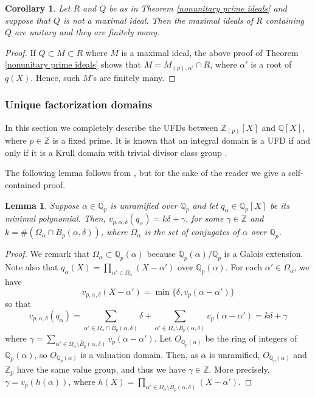 \documentclass[10pt]{article}
\numberwithin{equation}{section}
\newtheorem{Lem}[equation]{Lemma}
\newtheorem{Cor}[equation]{Corollary}
\theoremstyle{definition}
\theoremstyle{definition}
\newcommand{\Q}{\mathbb{Q}}
\newcommand{\Z}{\mathbb{Z}}
\newcommand{\oQp}{\overline{\Q_p}}
\begin{document}
\begin{Cor}
Let $R$ and $Q$ be as in Theorem \ref{nonunitary prime ideals} and suppose that $Q$ is not a maximal ideal. Then the maximal ideals of $R$ containing $Q$ are unitary and they are finitely many.
\end{Cor}
\begin{proof}
    If $Q\subset M\subset R$ where $M$ is a maximal ideal, the above proof of Theorem \ref{nonunitary prime ideals} shows that $M=M_{(p),\alpha'}\cap R$, where $\alpha'$ is a root of $q(X)$. Hence, such $M$'s are finitely many.
 \end{proof}
\vskip0.2cm

\subsubsection{Unique factorization domains}\label{section UFD local}

In this section we completely describe the UFDs between $\Z_{(p)}[X]$ and $\Q[X]$, where $p\in\Z$ is a fixed prime.
 It is known that an integral domain is a UFD if and only if it is a Krull domain with trivial divisor class group \cite[Proposition 6.1]{Fossum}.

The following lemma follows from \cite[Proposition 3.2 \& Proposition 3.7]{PS2}, but for the sake of the reader we give a self-contained proof.

\begin{Lem}\label{conjugates in the ball}
Suppose $\alpha\in\oQp$ is unramified over $\Q_p$ and let $q_{\alpha}\in\Q_p[X]$ be its minimal polynomial. Then, $v_{p,\alpha,\delta}(q_{\alpha})=k\delta+\gamma$, for some $\gamma\in\Z$ and $k=\#(\Omega_{\alpha}\cap\bar B_p(\alpha,\delta))$, where $\Omega_{\alpha}$ is the set of conjugates of $\alpha$ over $\Q_p$.
\end{Lem}
\begin{proof}
We remark that $\Omega_{\alpha}\subset\Q_p(\alpha)$ because $\Q_p(\alpha)/\Q_p$ is a Galois extension. Note also that $q_{\alpha}(X)=\prod\limits_{\alpha'\in\Omega_{\alpha}}(X-\alpha')$ over $\Q_p(\alpha)$.  
 For each $\alpha'\in\Omega_{\alpha}$, we have
$$v_{p,\alpha,\delta}(X-\alpha')=\min\{\delta,v_p(\alpha-\alpha')\}$$
so that 
$$v_{p,\alpha,\delta}(q_{\alpha})=\sum_{\alpha'\in\Omega_{\alpha}\cap\bar B_p(\alpha,\delta)}\delta+\sum_{\alpha'\in\Omega_{\alpha}\setminus \bar B_p(\alpha,\delta)}v_p(\alpha-\alpha')=k\delta+\gamma$$
where $\gamma=\sum\limits_{\alpha'\in\Omega_{\alpha}\setminus \bar B_p(\alpha,\delta)}v_p(\alpha-\alpha')$. Let $O_{\Q_p(\alpha)}$ be
the ring of integers of $\Q_p(\alpha)$, so $O_{\Q_p(\alpha)}$ is a valuation domain. 
Then, as $\alpha$ is unramified,
$O_{\Q_p(\alpha)}$ and $\Z_p$ have the same value group, and thus we have $\gamma\in\Z$. More precisely, $\gamma=v_p(h(\alpha))$, where $h(X)=\prod\limits_{\alpha'\in\Omega_{\alpha}\setminus \bar B_p(\alpha,\delta)}(X-\alpha')$.
\end{proof}
\end{document}
